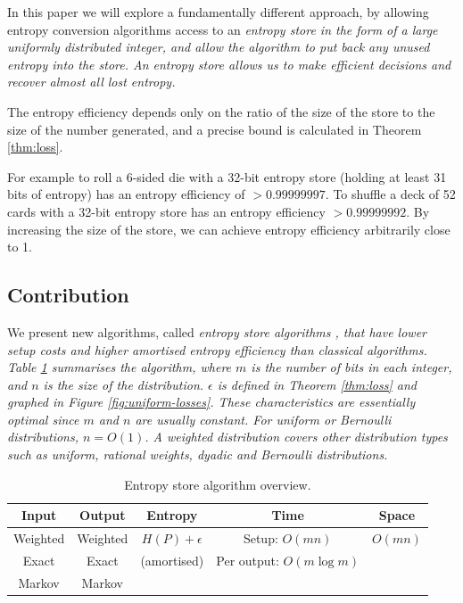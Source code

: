 \documentclass[12pt]{article}
\begin{document}
In this paper we will explore a fundamentally different approach, by allowing entropy conversion algorithms access to an \em entropy store \em in the form of a large uniformly distributed integer, and allow the algorithm to put back any unused entropy into the store. An entropy store allows us to make efficient decisions and recover almost all lost entropy.

The entropy efficiency depends only on the ratio of the size of the store to the size of the number generated, and a precise bound is calculated in Theorem \ref{thm:loss}. 

For example to roll a 6-sided die with a 32-bit entropy store (holding at least 31 bits of entropy) has an entropy efficiency of $>0.99999997$. To shuffle a deck of 52 cards with a 32-bit entropy store has an entropy efficiency $>0.99999992$. By increasing the size of the store, we can achieve entropy efficiency arbitrarily close to 1.


\subsection {Contribution}

We present new algorithms, called \em entropy store algorithms \em, that have lower setup costs and higher amortised entropy efficiency than classical algorithms. Table \ref{tab:entropy-store} summarises the algorithm, where $m$ is the number of bits in each integer, and $n$ is the size of the distribution. $\epsilon$ is defined in Theorem \ref{thm:loss} and graphed in Figure \ref{fig:uniform-losses}. These characteristics are essentially optimal since $m$ and $n$ are usually constant.  For uniform or Bernoulli distributions, $n=O(1)$. A weighted distribution covers other distribution types such as uniform, rational weights, dyadic and Bernoulli distributions.

\begin{table}[h!]
\centering
\begin{tabular}{|c|c|c|c|c|}
\hline
Input & Output & Entropy & Time & Space \\
\hline
Weighted & Weighted & $H(P)+\epsilon$ & Setup: $O(mn)$ & $O(mn)$ \\
Exact & Exact & (amortised) & Per output: $O(m \log m)$  &   \\
Markov & Markov &  &   &   \\
\hline
\end{tabular}
\caption{Entropy store algorithm overview.}
    \label{tab:entropy-store}
\end{table}
\end{document}
